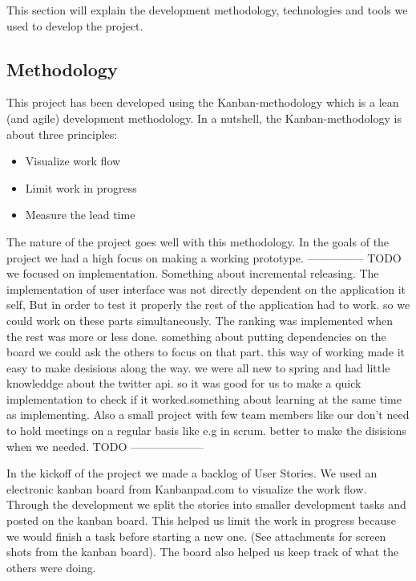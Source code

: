 
This section will explain the development methodology, technologies and tools we used to develop the project. 

\subsection{Methodology}


This project has been developed using the Kanban-methodology which is a lean (and agile) development methodology. In a nutshell, the Kanban-methodology is about three principles: 
\begin{itemize}
\item Visualize work flow 
\item Limit work in progress 
\item Measure the lead time
\end{itemize}

The nature of the project goes well with this methodology. In the goals of the project we had a high focus on making a working prototype. --------------- TODO we focused on implementation. Something about incremental releasing. The implementation of user interface was not directly dependent on the application it self,  But in order to test it properly the rest of the application had to work. so we could work on these parts simultaneously. The ranking was implemented when the rest was more or less done. something about putting dependencies on the board we could ask the others to focus on that part. 
this way of working made it easy to make desisions along the way. we were all new to spring and had little knowleddge about the twitter api. so it was good for us to make a quick implementation to check if it worked.something about learning at the same time as implementing. Also a small project with few team members like our don't need to hold meetings on a regular basis like e.g in scrum. better to make the disisions when we needed.  TODO --------------------


In the kickoff of the project we made a backlog of User Stories. We used an electronic kanban board from Kanbanpad.com \citep{TheHybridGroup2012} to visualize the work flow. Through the development we split the stories into smaller development tasks and posted on the kanban board. This helped us limit the work in progress because we would finish a task before starting a new one. (See attachments for screen shots from the kanban board). The board also helped us keep track of what the others were doing.

